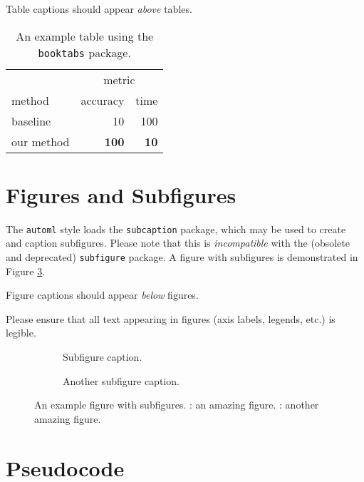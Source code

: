 \documentclass[11pt]{article}
\begin{document}
Table captions should appear \emph{above} tables.

\begin{table}
  \caption{An example table using the \texttt{booktabs} package.}
  \label{example_table}
  \centering
  \begin{tabular}{lrr}
    \toprule
    & \multicolumn{2}{c}{metric} \\
    \cmidrule{2-3}
    method & accuracy & time \\
    \midrule
    baseline & 10 & 100 \\
    our method & \textbf{100} & \textbf{10} \\
    \bottomrule
  \end{tabular}
\end{table}

\section{Figures and Subfigures}

The \texttt{automl} style loads the \texttt{subcaption} package, which may be
used to create and caption subfigures. Please note that this is
\emph{incompatible} with the (obsolete and deprecated) \texttt{subfigure}
package. A figure with subfigures is demonstrated in Figure
\ref{example_figure}.

Figure captions should appear \emph{below} figures.

Please ensure that all text appearing in figures (axis labels, legends, etc.)
is legible.

\begin{figure}
  \begin{subfigure}[t]{0.5\linewidth}
    \centering
    \caption{Subfigure caption.}
    \label{example_figure_left}
  \end{subfigure}
  \begin{subfigure}[t]{0.5\linewidth}
    \centering
    \caption{Another subfigure caption.}
    \label{example_figure_right}
  \end{subfigure}
  \caption{An example figure with subfigures. : an
    amazing figure. : another amazing figure.}
  \label{example_figure}
\end{figure}

\section{Pseudocode}
\label{sec:code}
\end{document}
